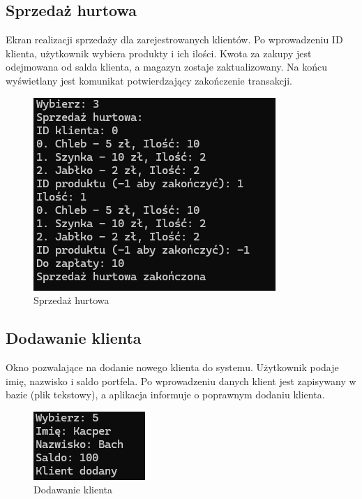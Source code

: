 \subsection{Sprzedaż hurtowa}
Ekran realizacji sprzedaży dla zarejestrowanych klientów. Po wprowadzeniu ID klienta, użytkownik wybiera produkty i ich ilości. Kwota za zakupy jest odejmowana od salda klienta, a magazyn zostaje zaktualizowany. Na końcu wyświetlany jest komunikat potwierdzający zakończenie transakcji.
\begin{figure}[ht]
    \centering
    \includegraphics[width=0.5\linewidth]{figures/Spr_hur.png}
    \caption{Sprzedaż hurtowa}
\end{figure}

\subsection{Dodawanie klienta}
Okno pozwalające na dodanie nowego klienta do systemu. Użytkownik podaje imię, nazwisko i saldo portfela. Po wprowadzeniu danych klient jest zapisywany w bazie (plik tekstowy), a aplikacja informuje o poprawnym dodaniu klienta.
\begin{figure}[ht]
    \centering
    \includegraphics[width=0.5\linewidth]{figures/Dodaj_kl.png}
    \caption{Dodawanie klienta}
\end{figure}

